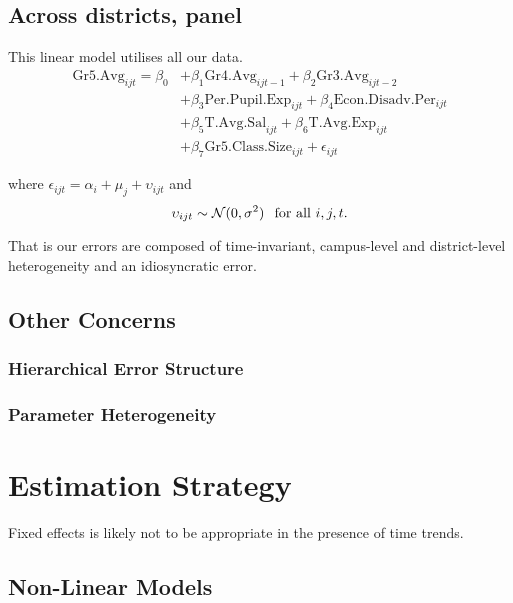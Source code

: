 \documentclass[11pt]{article}
\newcommand{\N}{\mathcal{N}}
\begin{document}
\subsection{Across districts, panel}
\label{ss:nextsub4}

This linear model utilises all our data.
\begin{align*}
\mathrm{Gr5.Avg}_{ijt} = \beta_{0} 
    &+ \beta_{1}  \mathrm{Gr4.Avg}_{ijt-1} 
    + \beta_{2}  \mathrm{Gr3.Avg}_{ijt-2}    \\
    &+ \beta_{3}  \mathrm{Per.Pupil.Exp}_{ijt} 
    + \beta_{4}  \mathrm{Econ.Disadv.Per}_{ijt} \\
    &+ \beta_{5}  \mathrm{T.Avg.Sal}_{ijt}   
    + \beta_{6}  \mathrm{T.Avg.Exp}_{ijt}  \\
    &+ \beta_{7}  \mathrm{Gr5.Class.Size}_{ijt} + \epsilon_{ijt}
\end{align*}

where $\epsilon_{ijt}=\alpha_{i}+\mu_{j}+\upsilon_{ijt}$ and
$$\upsilon_{ijt} \sim \N(0,\sigma^2) \hspace{0.1in} \mbox{for all } i,j,t.$$

That is  our errors are composed of time-invariant, campus-level and district-level heterogeneity and an idiosyncratic error. 

\subsection{Other Concerns}

\subsubsection{Hierarchical Error Structure}

\subsubsection{Parameter Heterogeneity}




\section{Estimation Strategy}

Fixed effects is likely not to be appropriate in the presence of time trends. 

\subsection{Non-Linear Models}
\end{document}
